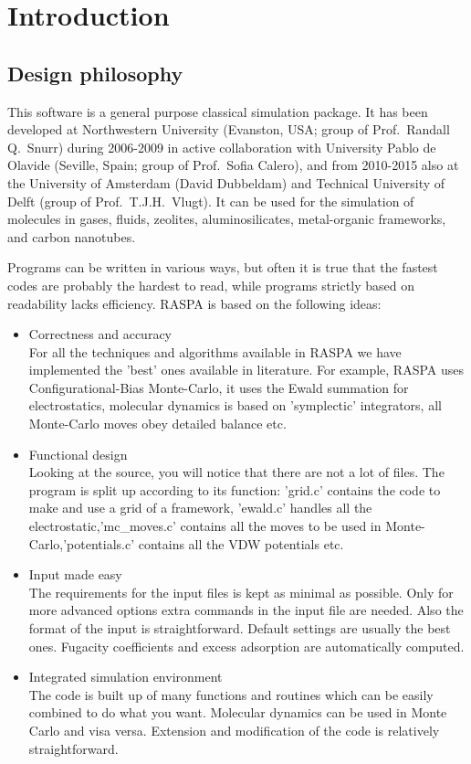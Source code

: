 \chapter{Introduction}


\section{Design philosophy}

This software is a general purpose classical simulation package. It has been developed at
Northwestern University (Evanston, USA; group of Prof.\ Randall Q.\ Snurr) during 2006-2009 in active collaboration
with University Pablo de Olavide (Seville, Spain; group of Prof.\ Sofia Calero),
and from 2010-2015 also at the University of Amsterdam (David Dubbeldam) and 
Technical University of Delft (group of Prof.\ T.J.H.\ Vlugt).
It can be used for the simulation of molecules in gases, fluids, zeolites, aluminosilicates,
metal-organic frameworks, and carbon nanotubes.

Programs can be written in various ways, but often it is true that the fastest codes are probably the hardest to read,
while programs strictly based on readability lacks efficiency. RASPA is based on the following ideas:
\begin{itemize}
  \item{Correctness and accuracy}\\
  For all the techniques and algorithms available in RASPA we have implemented the 'best' ones available in literature. 
  For example, RASPA uses Configurational-Bias Monte-Carlo, it uses the Ewald summation for electrostatics,
  molecular dynamics is based on 'symplectic' integrators, all Monte-Carlo moves obey detailed balance etc.
  \item{Functional design}\\
  Looking at the source, you will notice that there are not a lot of files. The program is split up according to its function:
  'grid.c' contains the code to make and use a grid of a framework, 'ewald.c' handles all the electrostatic,'mc\_moves.c' contains all the
  moves to be used in Monte-Carlo,'potentials.c' contains all the VDW potentials etc.
  \item{Input made easy}\\
  The requirements for the input files is kept as minimal as possible. Only for more advanced options extra commands in the input file are
  needed. Also the format of the input is straightforward. Default settings are usually the best ones. Fugacity coefficients and excess
  adsorption are automatically computed.
  \item{Integrated simulation environment}\\
  The code is built up of many functions and routines which can be easily combined to do what you want. Molecular dynamics can be
  used in Monte Carlo and visa versa. Extension and modification of the code is relatively straightforward.
\end{itemize}

